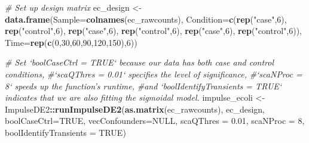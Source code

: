 \documentclass[]{article}
\newenvironment{Shaded}{\begin{snugshade}}{\end{snugshade}}
\newcommand{\KeywordTok}[1]{\textcolor[rgb]{0.13,0.29,0.53}{\textbf{#1}}}
\newcommand{\DataTypeTok}[1]{\textcolor[rgb]{0.13,0.29,0.53}{#1}}
\newcommand{\DecValTok}[1]{\textcolor[rgb]{0.00,0.00,0.81}{#1}}
\newcommand{\FloatTok}[1]{\textcolor[rgb]{0.00,0.00,0.81}{#1}}
\newcommand{\StringTok}[1]{\textcolor[rgb]{0.31,0.60,0.02}{#1}}
\newcommand{\CommentTok}[1]{\textcolor[rgb]{0.56,0.35,0.01}{\textit{#1}}}
\newcommand{\OtherTok}[1]{\textcolor[rgb]{0.56,0.35,0.01}{#1}}
\newcommand{\OperatorTok}[1]{\textcolor[rgb]{0.81,0.36,0.00}{\textbf{#1}}}
\newcommand{\NormalTok}[1]{#1}
\begin{document}
\begin{Shaded}
\begin{Highlighting}[]
\CommentTok{# Set up design matrix}
\NormalTok{ec_design <-}\StringTok{ }\KeywordTok{data.frame}\NormalTok{(}\DataTypeTok{Sample=}\KeywordTok{colnames}\NormalTok{(ec_rawcounts),}
                        \DataTypeTok{Condition=}\KeywordTok{c}\NormalTok{(}\KeywordTok{rep}\NormalTok{(}\StringTok{"case"}\NormalTok{,}\DecValTok{6}\NormalTok{), }\KeywordTok{rep}\NormalTok{(}\StringTok{"control"}\NormalTok{,}\DecValTok{6}\NormalTok{), }\KeywordTok{rep}\NormalTok{(}\StringTok{"case"}\NormalTok{,}\DecValTok{6}\NormalTok{), }
                                    \KeywordTok{rep}\NormalTok{(}\StringTok{"control"}\NormalTok{,}\DecValTok{6}\NormalTok{), }\KeywordTok{rep}\NormalTok{(}\StringTok{"case"}\NormalTok{,}\DecValTok{6}\NormalTok{), }
                                    \KeywordTok{rep}\NormalTok{(}\StringTok{"control"}\NormalTok{,}\DecValTok{6}\NormalTok{)), }
                        \DataTypeTok{Time=}\KeywordTok{rep}\NormalTok{(}\KeywordTok{c}\NormalTok{(}\DecValTok{0}\NormalTok{,}\DecValTok{30}\NormalTok{,}\DecValTok{60}\NormalTok{,}\DecValTok{90}\NormalTok{,}\DecValTok{120}\NormalTok{,}\DecValTok{150}\NormalTok{),}\DecValTok{6}\NormalTok{))}
\end{Highlighting}
\end{Shaded}

\begin{Shaded}
\begin{Highlighting}[]
\CommentTok{# Set `boolCaseCtrl = TRUE` because our data has both case and control conditions, }
\CommentTok{#`scaQThres = 0.01` specifies the level of significance, }
\CommentTok{#`scaNProc = 8` speeds up the function's runtime, }
\CommentTok{#and `boolIdentifyTransients = TRUE` indicates that we are also fitting the sigmoidal model.}
\NormalTok{impulse_ecoli <-}\StringTok{ }\NormalTok{ImpulseDE2}\OperatorTok{::}\KeywordTok{runImpulseDE2}\NormalTok{(}\KeywordTok{as.matrix}\NormalTok{(ec_rawcounts), }
\NormalTok{                                           ec_design, }\DataTypeTok{boolCaseCtrl=}\OtherTok{TRUE}\NormalTok{,}
                                           \DataTypeTok{vecConfounders=}\OtherTok{NULL}\NormalTok{, }\DataTypeTok{scaQThres =} \FloatTok{0.01}\NormalTok{,}
                                           \DataTypeTok{scaNProc =} \DecValTok{8}\NormalTok{, }
                                           \DataTypeTok{boolIdentifyTransients =} \OtherTok{TRUE}\NormalTok{)}
\end{Highlighting}
\end{Shaded}
\end{document}
